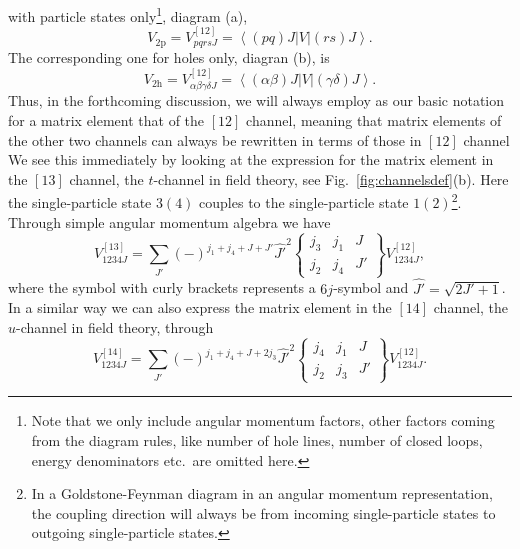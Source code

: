 \documentclass{article}
\begin{document}
with particle states only\footnote{Note that we only
include angular momentum factors,
other
factors coming from the diagram rules\cite{kstop81},
like number of hole lines,
number of closed loops, energy denominators
etc.\ are omitted here.}, diagram (a),
\begin{equation}
      V_{\mathrm{2p}}=V_{pqrs J}^{[12]}=
       \left\langle (pq)J\right | V\left | (rs)J\right\rangle.
       \label{eq:2pv}
\end{equation}
The corresponding one for holes only, diagran (b), is
\begin{equation}
      V_{\mathrm{2h}}=V_{\alpha\beta\gamma\delta J}^{[12]}=
       \left\langle (\alpha\beta)J\right | V
       \left | (\gamma\delta)J\right\rangle.
       \label{eq:2hv}
\end{equation}
Thus, in the forthcoming discussion, we will always employ as our
basic notation for a matrix element that of the $[12]$ channel,
meaning that matrix elements of the other two channels
can always be rewritten in terms of those in $[12]$ channel
We see this immediately by looking at the expression for the
matrix element in the $[13]$ channel, the $t$-channel in field
theory, see Fig.\
\ref{fig:channelsdef}(b). Here the single-particle state $3(4)$
couples to the single-particle state $1(2)$\footnote{In a Goldstone-Feynman
diagram in an angular momentum representation, the coupling direction
will always be from incoming single-particle states to outgoing
single-particle states.}.
Through simple angular momentum algebra we have
\begin{equation}
      V_{1234J}^{[13]}=
      {\displaystyle \sum_{J'}}(-)^{j_1+j_4+J+J'}\hat{J'}^2
      \left\{
      \begin{array}{ccc}
       j_3&j_1&J\\j_2&j_4&J'
      \end{array}
       \right\}V_{1234J}^{[12]},
       \label{eq:13channel}
\end{equation}
where the symbol with curly brackets represents a $6j$-symbol and
$\hat{J'}=\sqrt{2J'+1}$.
In a similar way we can also express the matrix
element in the $[14]$ channel, the $u$-channel in field theory,
through
\begin{equation}
       V_{1234J}^{[14]}=
      {\displaystyle \sum_{J'}}(-)^{j_1+j_4+J+2j_3}\hat{J'}^2
      \left\{
      \begin{array}{ccc}
       j_4&j_1&J\\j_2&j_3&J'
      \end{array}
       \right\}
       V_{1234J}^{[12]}.
       \label{eq:14channel}
\end{equation}
\end{document}
